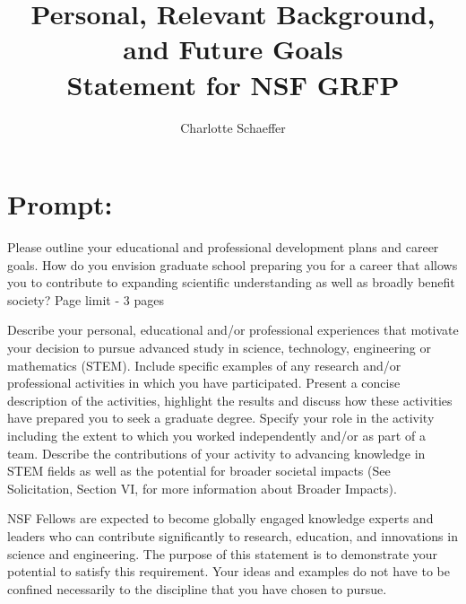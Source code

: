 \documentclass[12pt, doublespace]{article}
\begin{document}
\title{Personal, Relevant Background, and Future Goals\\ Statement for NSF GRFP}
\author{Charlotte Schaeffer}
\maketitle
\section*{Prompt:}
Please outline your educational and professional development plans and career goals. How do you envision graduate school preparing you for a career that allows you to contribute to expanding scientific understanding as well as broadly benefit society? Page limit - 3 pages 

Describe your personal, educational and/or professional experiences that motivate your decision to pursue advanced study in science, technology, engineering or mathematics (STEM). Include specific examples of any research and/or professional activities in which you have participated. Present a concise description of the activities, highlight the results and discuss how these activities have prepared you to seek a graduate degree. Specify your role in the activity including the extent to which you worked independently and/or as part of a team. Describe the contributions of your activity to advancing knowledge in STEM fields as well as the potential for broader societal impacts (See Solicitation, Section VI, for more information about Broader Impacts). 

NSF Fellows are expected to become globally engaged knowledge experts and leaders who can contribute significantly to research, education, and innovations in science and engineering. The purpose of this statement is to demonstrate your potential to satisfy this requirement. Your ideas and examples do not have to be confined necessarily to the discipline that you have chosen to pursue.

\pagebreak








\end{document}
